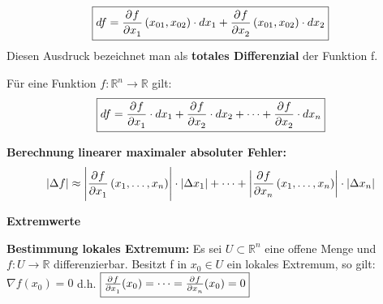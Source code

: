 \documentclass[fontset=ubuntu,12pt,a4paper,fleqn]{article}
\begin{document}
\[\boxed{df = \dpd{f}{x_1}(x_{01},x_{02})\cdot dx_1 + \dpd{f}{x_2}(x_{01},x_{02})\cdot dx_2} \]
Diesen Ausdruck bezeichnet man als \textbf{totales Differenzial} der Funktion f.

Für eine Funktion \(f:\mathbb{R}^n\to\mathbb{R}\) gilt:
\[\boxed{df = \dpd{f}{x_1}\cdot dx_1 + \dpd{f}{x_2}\cdot dx_2 + \cdots + \dpd{f}{x_2}\cdot dx_n}\]

\textbf{Berechnung linearer maximaler absoluter Fehler:} 
\[\left|\Delta f\right|\approx \left|\dpd{f}{x_1}(x_1,\dots,x_n)\right|\cdot\left|\Delta x_1\right|+\cdots+\left|\dpd{f}{x_n}(x_1,\dots,x_n)\right|\cdot\left|\Delta x_n\right|\]
\newpage







{\Large\textbf{Extremwerte}\par}

\textbf{Bestimmung lokales Extremum:} Es sei \(U \subset \mathbb{R}^n\) eine offene Menge und \(f:U\to\mathbb{R}\) differenzierbar. Besitzt f in \(x_0\in U\) ein lokales Extremum, so gilt:
\(\boxed{\nabla f(x_0)=0}\) d.h. \(\boxed{\pd{f}{x_1}(x_0)=\cdots=\pd{f}{x_n}(x_0)=0}\)\\
\end{document}
